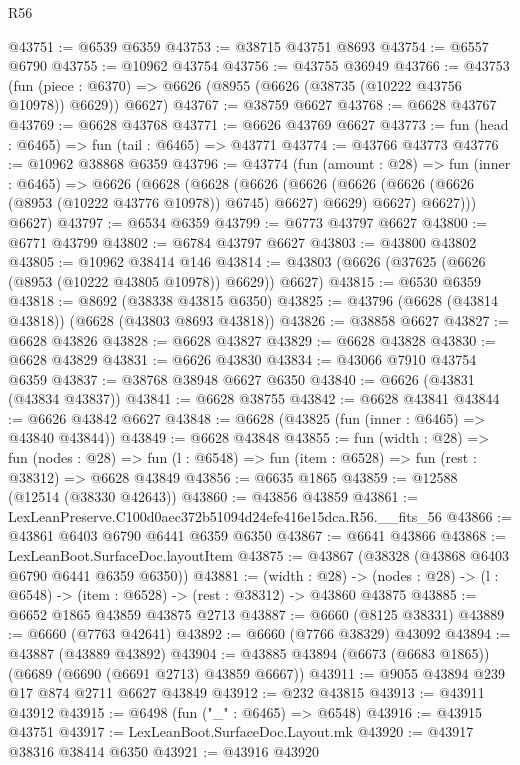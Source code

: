 \begin{lexlean}{R56}
\begin{coremodule}
@43751 := @6539 @6359
@43753 := @38715 @43751 @8693
@43754 := @6557 @6790
@43755 := @10962 @43754
@43756 := @43755 @36949
@43766 := @43753
    (fun (piece : @6370) => @6626 (@8955 (@6626 (@38735 (@10222 @43756 @10978)) @6629)) @6627)
@43767 := @38759 @6627
@43768 := @6628 @43767
@43769 := @6628 @43768
@43771 := @6626 @43769 @6627
@43773 := fun (head : @6465) => fun (tail : @6465) => @43771
@43774 := @43766 @43773
@43776 := @10962 @38868 @6359
@43796 := @43774
    (fun (amount : @28) =>
    fun (inner : @6465) =>
    @6626
      (@6628
        (@6628
          (@6626
            (@6626 (@6626 (@6626 (@6626 (@8953 (@10222 @43776 @10978)) @6745) @6627) @6629) @6627)
            @6627)))
      @6627)
@43797 := @6534 @6359
@43799 := @6773 @43797 @6627
@43800 := @6771 @43799
@43802 := @6784 @43797 @6627
@43803 := @43800 @43802
@43805 := @10962 @38414 @146
@43814 := @43803 (@6626 (@37625 (@6626 (@8953 (@10222 @43805 @10978)) @6629)) @6627)
@43815 := @6530 @6359
@43818 := @8692 (@38338 @43815 @6350)
@43825 := @43796 (@6628 (@43814 @43818)) (@6628 (@43803 @8693 @43818))
@43826 := @38858 @6627
@43827 := @6628 @43826
@43828 := @6628 @43827
@43829 := @6628 @43828
@43830 := @6628 @43829
@43831 := @6626 @43830
@43834 := @43066 @7910 @43754 @6359
@43837 := @38768 @38948 @6627 @6350
@43840 := @6626 (@43831 (@43834 @43837))
@43841 := @6628 @38755
@43842 := @6628 @43841
@43844 := @6626 @43842 @6627
@43848 := @6628 (@43825 (fun (inner : @6465) => @43840 @43844))
@43849 := @6628 @43848
@43855 := fun (width : @28) =>
  fun (nodes : @28) => fun (l : @6548) => fun (item : @6528) => fun (rest : @38312) => @6628 @43849
@43856 := @6635 @1865
@43859 := @12588 (@12514 (@38330 @42643))
@43860 := @43856 @43859
@43861 := LexLeanPreserve.C100d0aec372b51094d24efe416e15dca.R56.__fits_56
@43866 := @43861 @6403 @6790 @6441 @6359 @6350
@43867 := @6641 @43866
@43868 := LexLeanBoot.SurfaceDoc.layoutItem
@43875 := @43867 (@38328 (@43868 @6403 @6790 @6441 @6359 @6350))
@43881 := (width : @28) ->
  (nodes : @28) -> (l : @6548) -> (item : @6528) -> (rest : @38312) -> @43860 @43875
@43885 := @6652 @1865 @43859 @43875 @2713
@43887 := @6660 (@8125 @38331)
@43889 := @6660 (@7763 @42641)
@43892 := @6660 (@7766 @38329) @43092
@43894 := @43887 (@43889 @43892)
@43904 := @43885 @43894 (@6673 (@6683 @1865)) (@6689 (@6690 (@6691 @2713) @43859 @6667))
@43911 := @9055 @43894 @239 @17 @874 @2711 @6627 @43849
@43912 := @232 @43815
@43913 := @43911 @43912
@43915 := @6498 (fun ("_" : @6465) => @6548)
@43916 := @43915 @43751
@43917 := LexLeanBoot.SurfaceDoc.Layout.mk
@43920 := @43917 @38316 @38414 @6350
@43921 := @43916 @43920

\end{coremodule}
\end{lexlean}
